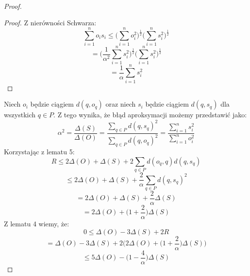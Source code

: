 \begin{proof}
\begin{proof}
        Z nierówności Schwarza:
        \begin{equation}
            \sum_{i=1}^{n} o_{i} s_{i} \leq \Big( \sum_{i=1}^{n} o_{i}^{2} \Big)^{\frac{1}{2}} \Big( \sum_{i=1}^{n} s_{i}^{2} \Big)^{\frac{1}{2}}
        \end{equation}
        \begin{equation}
            = \Big( \frac{1}{\alpha^{2}}\sum_{i=1}^{n} s_{i}^{2} \Big)^{\frac{1}{2}} \Big( \sum_{i=1}^{n} s_{i}^{2} \Big)^{\frac{1}{2}}
        \end{equation}
        \begin{equation}
            = \frac{1}{\alpha} \sum_{i=1}^{n} s_{i}^{2}
        \end{equation}
    \end{proof}
    Niech $o_{i}$ będzie ciągiem $d(q, o_{q})$ oraz niech $s_{i}$ będzie ciągiem $d(q,s_{q})$ dla wszystkich $q \in P$.
    Z tego wynika, że błąd aproksymacji możemy przedstawić jako:
    \begin{equation}
        \alpha^{2} = \frac{\Delta(S)}{\Delta(O)} = \frac{\sum_{q \in P} d(q,s_{q})^{2}}{\sum_{q \in P} d(q,o_{q})^{2}} =\frac{\sum_{i=1}^{n} s_{i}^{2}}{\sum_{i=1}^{n} o_{i}^{2}}
    \end{equation}
    Korzystając z lematu 5:
    \begin{equation}
        R \leq 2\Delta(O) + \Delta(S) + 2\sum_{q \in P} d(o_{q}, q)d(q, s_{q}) 
    \end{equation}
    \begin{equation}
        \leq 2\Delta(O) + \Delta(S) + \frac{2}{\alpha}\sum_{q \in P} d(q, s_{q})^{2} 
    \end{equation}
    \begin{equation}
        = 2\Delta(O) + \Delta(S) + \frac{2}{\alpha}\Delta(S)
    \end{equation}
    \begin{equation}
        = 2\Delta(O) + \Big(1 + \frac{2}{\alpha} \Big)\Delta(S)
    \end{equation}
    Z lematu 4 wiemy, że:
    \begin{equation}
        0 \leq \Delta(O) - 3\Delta(S) + 2R
    \end{equation}
    \begin{equation}
        = \Delta(O) - 3\Delta(S) + 2\Big(2\Delta(O) + \Big(1 + \frac{2}{\alpha} \Big)\Delta(S)\Big)
    \end{equation}
    \begin{equation}
        \leq 5\Delta(O) - \Big(1 - \frac{4}{\alpha} \Big)\Delta(S)

\end{equation}
\end{proof}
